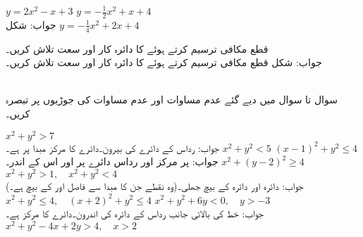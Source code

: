 $y=2x^2-x+3$
$y=-\tfrac{1}{2}x^2+x+4$\\
جواب:\quad
شکل 
$y=-\tfrac{1}{4}x^2+2x+4$

قطع مکافی  ترسیم کرتے ہوئے  کا دائرہ کار اور سعت تلاش کریں۔\\
جواب:\quad
شکل 
قطع مکافی  ترسیم کرتے ہوئے  کا دائرہ کار اور سعت تلاش کریں۔

\\

سوال  تا سوال  میں دیے گئے عدم مساوات اور عدم مساوات کی جوڑیوں پر تبصرہ کریں۔

$x^2+y^2>7$\\
جواب:\quad
رداس  کے دائرے کی بیرون۔دائرے کا مرکز مبدا پر ہے۔
$x^2+y^2<5$
$(x-1)^2+y^2\le 4$\\
جواب:\quad
{} پر مرکز اور رداس  دائرے پر اور اس کے اندر۔
$x^2+(y-2)^2\ge 4$
$x^2+y^2>1,\quad x^2+y^2<4$\\
جواب:\quad
دائرہ  اور دائرہ  کے بیچ جھلی۔(وہ نقطے جن کا مبدا سے فاصل  اور  کے بیچ ہے۔)
$x^2+y^2\le 4,\quad (x+2)^2+y^2\le 4$
$x^2+y^2+6y<0,\quad y>-3$\\
جواب:\quad
خط  کی بالائی جانب رداس  کے دائرہ کی اندرون۔دائرے کا مرکز  ہے۔
$x^2+y^2-4x+2y>4,\quad x>2$

